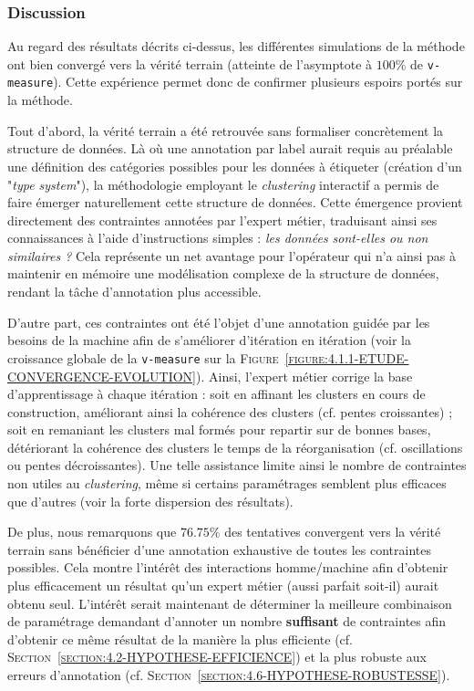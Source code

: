 		\subsubsection{Discussion}
			
			Au regard des résultats décrits ci-dessus, les différentes simulations de la méthode ont bien convergé vers la vérité terrain (atteinte de l'asymptote à $100$\% de \texttt{v-measure}).
			Cette expérience permet donc de confirmer plusieurs espoirs portés sur la méthode.
			
			Tout d'abord, la vérité terrain a été retrouvée sans formaliser concrètement la structure de données.
			Là où une annotation par label aurait requis au préalable une définition des catégories possibles pour les données à étiqueter (création d'un "\textit{type system}"), la méthodologie employant le \textit{clustering} interactif a permis de faire émerger naturellement cette structure de données.
			Cette émergence provient directement des contraintes annotées par l'expert métier, traduisant ainsi ses connaissances à l'aide d'instructions simples : \textit{les données sont-elles ou non similaires ?}
			Cela représente un net avantage pour l'opérateur qui n'a ainsi pas à maintenir en mémoire une modélisation complexe de la structure de données, rendant la tâche d'annotation plus accessible.
			
			D'autre part, ces contraintes ont été l'objet d'une annotation guidée par les besoins de la machine afin de s'améliorer d'itération en itération (voir la croissance globale de la \texttt{v-measure} sur la \textsc{Figure~\ref{figure:4.1.1-ETUDE-CONVERGENCE-EVOLUTION}}).
			Ainsi, l'expert métier corrige la base d'apprentissage à chaque itération : soit en affinant les clusters en cours de construction, améliorant ainsi la cohérence des clusters (cf. pentes croissantes) ; soit en remaniant les clusters mal formés pour repartir sur de bonnes bases, détériorant la cohérence des clusters le temps de la réorganisation (cf. oscillations ou pentes décroissantes).
			Une telle assistance limite ainsi le nombre de contraintes non utiles au \textit{clustering}, même si certains paramétrages semblent plus efficaces que d'autres (voir la forte dispersion des résultats).
			
			De plus, nous remarquons que $76.75$\% des tentatives convergent vers la vérité terrain sans bénéficier d'une annotation exhaustive de toutes les contraintes possibles.
			Cela montre l'intérêt des interactions homme/machine afin d'obtenir plus efficacement un résultat qu'un expert métier (aussi parfait soit-il) aurait obtenu seul. 
			L'intérêt serait maintenant de déterminer la meilleure combinaison de paramétrage demandant d'annoter un nombre \textbf{suffisant} de contraintes afin d'obtenir ce même résultat de la manière la plus efficiente (cf. \textsc{Section~\ref{section:4.2-HYPOTHESE-EFFICIENCE}}) et la plus robuste aux erreurs d'annotation (cf. \textsc{Section~\ref{section:4.6-HYPOTHESE-ROBUSTESSE}}).
			\\

